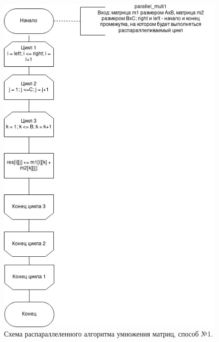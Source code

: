 \documentclass[12pt]{report}
\begin{document}
\begin{figure}[h]
	\centering
	\includegraphics[scale=0.85]{parallel1.jpg}
	\caption{Схема распараллеленного алгоритма умножения матриц, способ №1.}
	\label{fig:mpr}
\end{figure}
\end{document}
